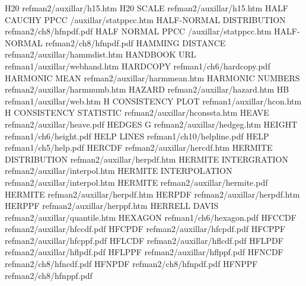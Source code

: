 H20                                     refman2/auxillar/h15.htm
H20 SCALE                               refman2/auxillar/h15.htm
HALF CAUCHY PPCC                        /auxillar/statppcc.htm
HALF-NORMAL DISTRIBUTION                refman2/ch8/hfnpdf.pdf
HALF NORMAL PPCC                        /auxillar/statppcc.htm
HALF-NORMAL                             refman2/ch8/hfnpdf.pdf
HAMMING DISTANCE                        refman2/auxillar/hammdist.htm
HANDBOOK URL                            refman1/auxillar/webhand.htm
HARDCOPY                                refman1/ch6/hardcopy.pdf
HARMONIC MEAN                           refman2/auxillar/harmmean.htm
HARMONIC NUMBERS                        refman2/auxillar/harmnumb.htm
HAZARD                                  refman2/auxillar/hazard.htm
HB                                      refman1/auxillar/web.htm
H CONSISTENCY PLOT                      refman1/auxillar/hcon.htm
H CONSISTENCY STATISTIC                 refman2/auxillar/hconssta.htm
HEAVE                                   refman2/auxillar/heave.pdf
HEDGES G                                refman2/auxillar/hedgeg.htm
HEIGHT                                  refman1/ch6/height.pdf
HELP LINES                              refman1/ch10/helpline.pdf
HELP                                    refman1/ch5/help.pdf
HERCDF                                  refman2/auxillar/hercdf.htm
HERMITE DISTRIBUTION                    refman2/auxillar/herpdf.htm
HERMITE INTERGRATION                    refman2/auxillar/interpol.htm
HERMITE INTERPOLATION                   refman2/auxillar/interpol.htm
HERMITE                                 refman2/auxillar/hermite.pdf
HERMITE                                 refman2/auxillar/herpdf.htm
HERPDF                                  refman2/auxillar/herpdf.htm
HERPPF                                  refman2/auxillar/herppf.htm
HERRELL DAVIS                           refman2/auxillar/quantile.htm
HEXAGON                                 refman1/ch6/hexagon.pdf
HFCCDF                                  refman2/auxillar/hfccdf.pdf
HFCPDF                                  refman2/auxillar/hfcpdf.pdf
HFCPPF                                  refman2/auxillar/hfcppf.pdf
HFLCDF                                  refman2/auxillar/hflcdf.pdf
HFLPDF                                  refman2/auxillar/hflpdf.pdf
HFLPPF                                  refman2/auxillar/hflppf.pdf
HFNCDF                                  refman2/ch8/hfncdf.pdf
HFNPDF                                  refman2/ch8/hfnpdf.pdf
HFNPPF                                  refman2/ch8/hfnppf.pdf
